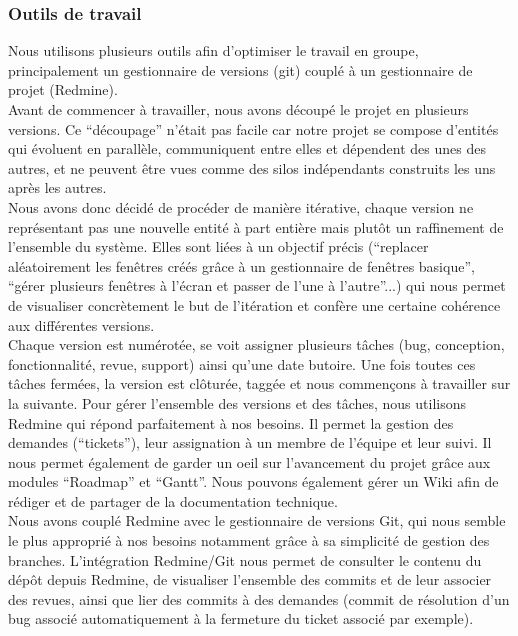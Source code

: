 \subsubsection{Outils de travail}
\label{Outils de travail}
Nous utilisons plusieurs outils afin d'optimiser le travail en groupe, principalement un gestionnaire de versions (git) couplé à un gestionnaire de projet (Redmine).\\

Avant de commencer à travailler, nous avons découpé le projet en plusieurs versions. Ce ``découpage'' n'était pas facile car notre projet se compose d'entités qui évoluent en parallèle, communiquent entre elles et dépendent des unes des autres, et ne peuvent être vues comme des silos indépendants construits les uns après les autres.\\

Nous avons donc décidé de procéder de manière itérative, chaque version ne représentant pas une nouvelle entité à part entière mais plutôt un raffinement de l'ensemble du système. Elles sont liées à un objectif précis (``replacer aléatoirement les fenêtres créés grâce à un gestionnaire de fenêtres basique'', ``gérer plusieurs fenêtres à l'écran et passer de l'une à l'autre''...) qui nous permet de visualiser concrètement le but de l'itération et confère une certaine cohérence aux différentes versions.\\

Chaque version est numérotée, se voit assigner plusieurs tâches (bug, conception, fonctionnalité, revue, support) ainsi qu'une date butoire. Une fois toutes ces tâches fermées, la version est clôturée, taggée et nous commençons à travailler sur la suivante. Pour gérer l'ensemble des versions et des tâches, nous utilisons Redmine qui répond parfaitement à nos besoins. Il permet la gestion des demandes (``tickets''), leur assignation à un membre de l'équipe et leur suivi. Il nous permet également de garder un oeil sur l'avancement du projet grâce aux modules ``Roadmap'' et ``Gantt''. Nous pouvons également gérer un Wiki afin de rédiger et de partager de la documentation technique.\\

Nous avons couplé Redmine avec le gestionnaire de versions Git, qui nous semble le plus approprié à nos besoins notamment grâce à sa simplicité de gestion des branches. L'intégration Redmine/Git nous permet de consulter le contenu du dépôt depuis Redmine, de visualiser l'ensemble des commits et de leur associer des revues, ainsi que lier des commits à des demandes (commit de résolution d'un bug associé automatiquement à la fermeture du ticket associé par exemple).\\

